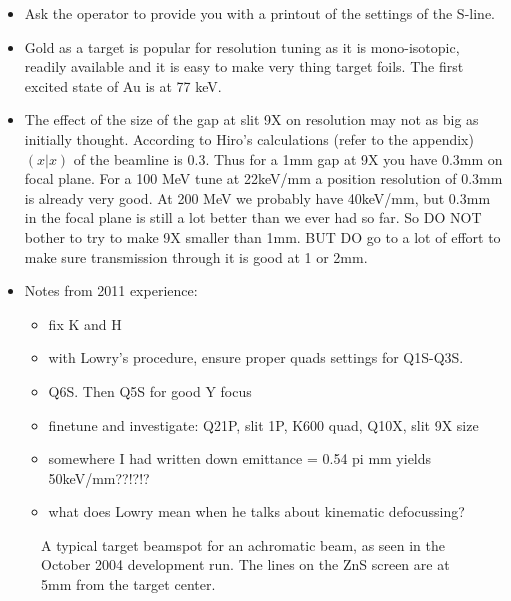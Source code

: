 \documentclass[11pt]{report}
\begin{document}
\begin{itemize}
\item Ask the operator to provide you with a printout of the settings of
      the S-line.

\item Gold as a target is popular for resolution tuning as it is mono-isotopic, readily available
      and it is easy to make very thing target foils.
      The first excited state of Au is at 77 keV.
      
\item The effect of the size of the gap at slit 9X on resolution may not as big as initially thought.
      According to Hiro's calculations (refer to the appendix) $(x|x)$ of the beamline is 0.3.
      Thus for a 1mm gap at 9X you have 0.3mm on focal plane. 
      For a 100 MeV tune at 22keV/mm a position resolution of 0.3mm is already very good.
      At 200 MeV we probably have 40keV/mm, but 0.3mm in the focal plane is still
      a lot better than we ever had so far.
      So DO NOT bother to try to make 9X smaller than 1mm.
      BUT DO go to a lot of effort to make sure transmission through it is good
      at 1 or 2mm.

\item Notes from 2011 experience:
	\begin{itemize}
	\item fix K and H
	\item with Lowry's procedure, ensure proper quads settings for Q1S-Q3S.
	\item Q6S. Then Q5S for good Y focus
	\item finetune and investigate: Q21P, slit 1P, K600 quad, Q10X, slit 9X size
	\item somewhere I had written down emittance = 0.54 pi mm yields 50keV/mm??!?!?
	\item what does Lowry mean when he talks about kinematic defocussing?
	\end{itemize}



\end{itemize}

\begin{figure}[!ht]
\centerline{\vspace{0cm}\hspace{0cm}
}
\centering
\caption{A typical target beamspot for an achromatic beam, as seen in the October 2004 development run.
The lines on the ZnS screen are at 5mm from the target center.}
\label{fig:beamspot-ach-beam-1}
\end{figure} 
\end{document}
